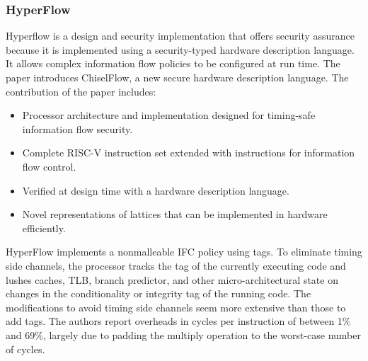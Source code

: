 

\subsubsection{HyperFlow} 
Hyperflow\cite{HyperFlow} is a design and security implementation that offers security assurance because it is implemented 
using a security-typed hardware description language. It allows complex information flow policies to 
be configured at run time. The paper introduces ChiselFlow, a new secure hardware description language. 
The contribution of the paper includes: 
\begin{itemize}
  \item Processor architecture and implementation designed for timing-safe information flow security. 
  \item Complete RISC-V instruction set extended with instructions for information flow control. 
  \item Verified at design time with a hardware description language. 
  \item Novel representations of lattices that can be implemented in hardware efficiently. 
\end{itemize}
HyperFlow implements a nonmalleable IFC policy using tags.
To eliminate timing side channels, the processor tracks the tag of the currently executing code and lushes caches,
TLB, branch predictor, and other micro-architectural state on changes in the conditionality or integrity tag of the
running code. The modifications to avoid timing side channels seem more extensive than those to add tags. The
authors report overheads in cycles per instruction of between 1\% and 69\%, largely due to padding the multiply
operation to the worst-case number of cycles.

